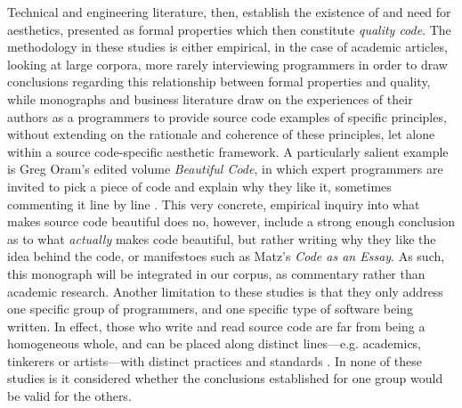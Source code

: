 Technical and engineering literature, then, establish the existence of and need for aesthetics, presented as formal properties which then constitute \emph{quality code}. The methodology in these studies is either empirical, in the case of academic articles, looking at large corpora, more rarely interviewing programmers in order to draw conclusions regarding this relationship between formal properties and quality, while monographs and business literature draw on the experiences of their authors as a programmers to provide source code examples of specific principles, without extending on the rationale and coherence of these principles, let alone within a source code-specific aesthetic framework. A particularly salient example is Greg Oram's edited volume \emph{Beautiful Code}, in which expert programmers are invited to pick a piece of code and explain why they like it, sometimes commenting it line by line \citep{oram_beautiful_2007}. This very concrete, empirical inquiry into what makes source code beautiful does no, however, include a strong enough conclusion as to what \emph{actually} makes code beautiful, but rather writing why they like the idea behind the code, or manifestoes such as Matz's \emph{Code as an Essay}. As such, this monograph will be integrated in our corpus, as commentary rather than academic research. Another limitation to these studies is that they only address one specific group of programmers, and one specific type of software being written. In effect, those who write and read source code are far from being a homogeneous whole, and can be placed along distinct lines—e.g. academics, tinkerers or artists—with distinct practices and standards \citep{hayes_cultures_2017}. In none of these studies is it considered whether the conclusions established for one group would be valid for the others.

